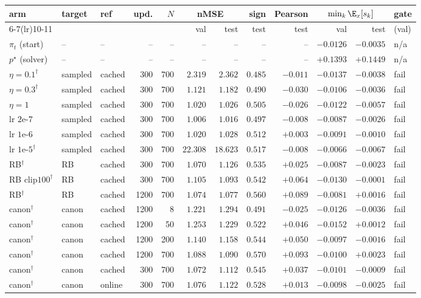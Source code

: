 \begin{tabular}{lllrrrrrrrrl}
\toprule
arm & target & ref & upd. & $N$ & \multicolumn{2}{c}{nMSE} & sign & Pearson & \multicolumn{2}{c}{$\min_k\E_x[s_k]$} & gate\\
\cmidrule(lr){6-7}\cmidrule(lr){10-11}
 & & & & & val & test & test & test & val & test & (val)\\
\midrule
$\pi_t$ (start) & -- & -- & -- & -- & -- & -- & -- & -- & $-0.0126$ & $-0.0035$ & n/a\\
$p^\star$ (solver) & -- & -- & -- & -- & -- & -- & -- & -- & $+0.1393$ & $+0.1449$ & n/a\\
$\eta{=}0.1^{\dagger}$ & sampled & cached & 300 & 700 & $2.319$ & $2.362$ & $0.485$ & $-0.011$ & $-0.0137$ & $-0.0038$ & fail\\
$\eta{=}0.3^{\dagger}$ & sampled & cached & 300 & 700 & $1.121$ & $1.182$ & $0.490$ & $-0.030$ & $-0.0106$ & $-0.0036$ & fail\\
$\eta{=}1$ & sampled & cached & 300 & 700 & $1.020$ & $1.026$ & $0.505$ & $-0.026$ & $-0.0122$ & $-0.0057$ & fail\\
lr $2$e-$7$ & sampled & cached & 300 & 700 & $1.006$ & $1.016$ & $0.497$ & $-0.008$ & $-0.0087$ & $-0.0026$ & fail\\
lr $1$e-$6$ & sampled & cached & 300 & 700 & $1.020$ & $1.028$ & $0.512$ & $+0.003$ & $-0.0091$ & $-0.0010$ & fail\\
lr $1$e-$5^{\dagger}$ & sampled & cached & 300 & 700 & $22.308$ & $18.623$ & $0.517$ & $-0.008$ & $-0.0066$ & $-0.0067$ & fail\\
RB$^{\dagger}$ & RB & cached & 300 & 700 & $1.070$ & $1.126$ & $0.535$ & $+0.025$ & $-0.0087$ & $-0.0023$ & fail\\
RB clip$100^{\dagger}$ & RB & cached & 300 & 700 & $1.105$ & $1.093$ & $0.542$ & $+0.064$ & $-0.0130$ & $-0.0001$ & fail\\
RB$^{\dagger}$ & RB & cached & 1200 & 700 & $1.074$ & $1.077$ & $0.560$ & $+0.089$ & $-0.0081$ & $+0.0016$ & fail\\
canon$^{\dagger}$ & canon & cached & 1200 & 8 & $1.221$ & $1.294$ & $0.491$ & $-0.025$ & $-0.0126$ & $-0.0036$ & fail\\
canon$^{\dagger}$ & canon & cached & 1200 & 50 & $1.253$ & $1.229$ & $0.522$ & $+0.046$ & $-0.0152$ & $+0.0012$ & fail\\
canon$^{\dagger}$ & canon & cached & 1200 & 200 & $1.140$ & $1.158$ & $0.544$ & $+0.050$ & $-0.0097$ & $-0.0016$ & fail\\
canon$^{\dagger}$ & canon & cached & 1200 & 700 & $1.088$ & $1.090$ & $0.570$ & $+0.093$ & $-0.0100$ & $+0.0023$ & fail\\
canon$^{\dagger}$ & canon & cached & 300 & 700 & $1.072$ & $1.112$ & $0.545$ & $+0.037$ & $-0.0101$ & $-0.0009$ & fail\\
canon$^{\dagger}$ & canon & online & 300 & 700 & $1.076$ & $1.122$ & $0.528$ & $+0.013$ & $-0.0098$ & $-0.0025$ & fail\\
\bottomrule
\end{tabular}
